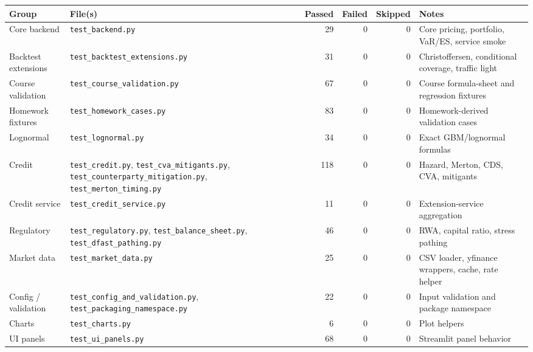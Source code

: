 \documentclass[11pt]{article}
\newcommand{\code}[1]{\texttt{#1}}
\begin{document}
\begin{center}
\footnotesize
\begin{tabular}{L{2.4cm}L{4.5cm}rrrL{3.5cm}}
\toprule
\textbf{Group} & \textbf{File(s)} & \textbf{Passed} & \textbf{Failed} & \textbf{Skipped} & \textbf{Notes} \\
\midrule
Core backend              & \code{test\_backend.py}                                   & 29  & 0 & 0 & Core pricing, portfolio, VaR/ES, service smoke \\
Backtest extensions       & \code{test\_backtest\_\allowbreak extensions.py}          & 31  & 0 & 0 & Christoffersen, conditional coverage, traffic light \\
Course validation         & \code{test\_course\_\allowbreak validation.py}            & 67  & 0 & 0 & Course formula-sheet and regression fixtures \\
Homework fixtures         & \code{test\_homework\_\allowbreak cases.py}               & 83  & 0 & 0 & Homework-derived validation cases \\
Lognormal                 & \code{test\_lognormal.py}                                 & 34  & 0 & 0 & Exact GBM/lognormal formulas \\
Credit                    & \code{test\_credit.py}, \code{test\_cva\_\allowbreak mitigants.py}, \code{test\_counterparty\_\allowbreak mitigation.py}, \code{test\_merton\_\allowbreak timing.py} & 118 & 0 & 0 & Hazard, Merton, CDS, CVA, mitigants \\
Credit service            & \code{test\_credit\_\allowbreak service.py}               & 11  & 0 & 0 & Extension-service aggregation \\
Regulatory                & \code{test\_regulatory.py}, \code{test\_balance\_\allowbreak sheet.py}, \code{test\_dfast\_\allowbreak pathing.py} & 46 & 0 & 0 & RWA, capital ratio, stress pathing \\
Market data               & \code{test\_market\_\allowbreak data.py}                  & 25  & 0 & 0 & CSV loader, yfinance wrappers, cache, rate helper \\
Config / validation       & \code{test\_config\_and\_\allowbreak validation.py}, \code{test\_packaging\_\allowbreak namespace.py} & 22 & 0 & 0 & Input validation and package namespace \\
Charts                    & \code{test\_charts.py}                                    &  6  & 0 & 0 & Plot helpers \\
UI panels                 & \code{test\_ui\_panels.py}                                & 68  & 0 & 0 & Streamlit panel behavior \\

\end{tabular}
\end{center}
\end{document}
